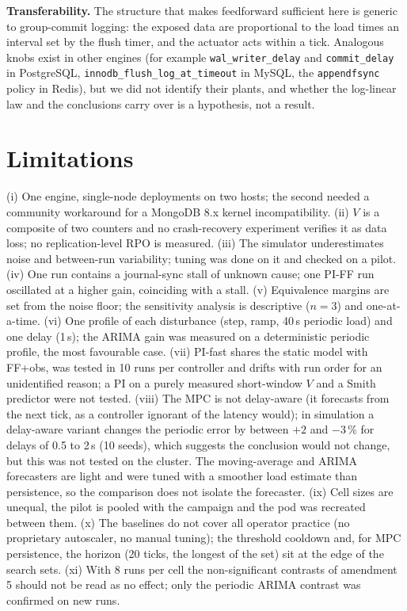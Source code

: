 \documentclass[journal]{IEEEtran}
\begin{document}
\textbf{Transferability.} The structure that makes feedforward sufficient here is generic to group-commit logging: the exposed data are proportional to the load times an interval set by the flush timer, and the actuator acts within a tick. Analogous knobs exist in other engines (for example \texttt{wal\_writer\_delay} and \texttt{commit\_delay} in PostgreSQL, \texttt{innodb\_flush\_log\_at\_timeout} in MySQL, the \texttt{appendfsync} policy in Redis), but we did not identify their plants, and whether the log-linear law and the conclusions carry over is a hypothesis, not a result.

\section{Limitations}\label{sec:limits}
(i) One engine, single-node deployments on two hosts; the second needed a community workaround for a MongoDB 8.x kernel incompatibility. (ii) $V$ is a composite of two counters and no crash-recovery experiment verifies it as data loss; no replication-level RPO is measured. (iii) The simulator underestimates noise and between-run variability; tuning was done on it and checked on a pilot. (iv) One run contains a journal-sync stall of unknown cause; one PI-FF run oscillated at a higher gain, coinciding with a stall. (v) Equivalence margins are set from the noise floor; the sensitivity analysis is descriptive ($n=3$) and one-at-a-time. (vi) One profile of each disturbance (step, ramp, 40\,s periodic load) and one delay (1\,s); the ARIMA gain was measured on a deterministic periodic profile, the most favourable case. (vii) PI-fast shares the static model with FF+obs, was tested in 10 runs per controller and drifts with run order for an unidentified reason; a PI on a purely measured short-window $V$ and a Smith predictor were not tested. (viii) The MPC is not delay-aware (it forecasts from the next tick, as a controller ignorant of the latency would); in simulation a delay-aware variant changes the periodic error by between $+2$ and $-3$\,\% for delays of 0.5 to 2\,s (10 seeds), which suggests the conclusion would not change, but this was not tested on the cluster. The moving-average and ARIMA forecasters are light and were tuned with a smoother load estimate than persistence, so the comparison does not isolate the forecaster. (ix) Cell sizes are unequal, the pilot is pooled with the campaign and the pod was recreated between them. (x) The baselines do not cover all operator practice (no proprietary autoscaler, no manual tuning); the threshold cooldown and, for MPC persistence, the horizon (20 ticks, the longest of the set) sit at the edge of the search sets. (xi) With 8 runs per cell the non-significant contrasts of amendment 5 should not be read as no effect; only the periodic ARIMA contrast was confirmed on new runs.
\end{document}
